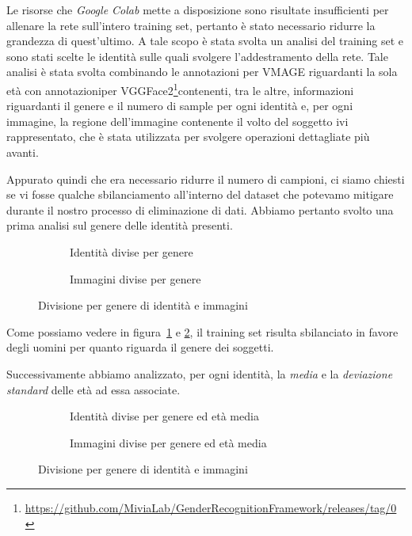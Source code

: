 Le risorse che \textit{Google Colab} mette a disposizione sono risultate insufficienti per allenare la rete sull'intero training set, pertanto è stato necessario ridurre la grandezza di quest'ultimo. A tale scopo è stata svolta un analisi del training set e sono stati scelte le identità sulle quali svolgere l'addestramento della rete. Tale analisi è stata svolta combinando le annotazioni per VMAGE riguardanti la sola età con annotazioniper VGGFace2\footnote{\url{https://github.com/MiviaLab/GenderRecognitionFramework/releases/tag/0}}contenenti, tra le altre, informazioni riguardanti il genere e il numero di sample per ogni identità e, per ogni immagine, la regione dell'immagine contenente il volto del soggetto ivi rappresentato, che è stata utilizzata per svolgere operazioni dettagliate più avanti.

Appurato quindi che era necessario ridurre il numero di campioni, ci siamo chiesti se vi fosse qualche sbilanciamento all'interno del dataset che potevamo mitigare durante il nostro processo di eliminazione di dati. Abbiamo pertanto svolto una prima analisi sul genere delle identità presenti.

\begin{figure}[ht]

\begin{subfigure}{0.5\textwidth}
\def\svgscale{0.5}

\caption{Identità divise per genere}
\label{sfig:Ids per gender}
\end{subfigure}
\begin{subfigure}{0.5\textwidth}
\def\svgscale{0.5}

\caption{Immagini divise per genere}
\label{sfig:Images per gender}
\end{subfigure}
\caption{Divisione per genere di identità e immagini}
\label{fig:gender_division}
\end{figure}

Come possiamo vedere in figura~\ref{sfig:Ids per gender} e \ref{sfig:Images per gender}, il training set risulta sbilanciato in favore degli uomini per quanto riguarda il genere dei soggetti.

Successivamente abbiamo analizzato, per ogni identità, la \emph{media} e la \emph{deviazione standard} delle età ad essa associate.

\begin{figure}[ht]

\begin{subfigure}{0.5\textwidth}
\def\svgscale{0.42}

\caption{Identità divise per genere ed età media}
\label{sfig:Ids per gender and mean age}
\end{subfigure}
\begin{subfigure}{0.5\textwidth}
\def\svgscale{0.42}

\caption{Immagini divise per genere ed età media}
\label{sfig:Images per gender and mean age}
\end{subfigure}
\caption{Divisione per genere di identità e immagini}
\label{fig:gender_age_division}
\end{figure}

